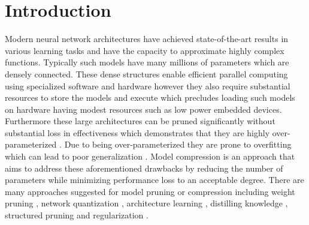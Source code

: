 \documentclass[final,1p,times]{elsarticle}
\begin{document}
\section{Introduction}
\label{s:Introduction}
Modern neural network architectures have achieved state-of-the-art results in various learning tasks and have the capacity to approximate highly complex functions. Typically such models have many millions of parameters which are densely connected. These dense structures enable efficient parallel computing using specialized software and hardware however they also require substantial resources to store the models and execute which precludes loading such models on hardware having modest resources such as low power embedded devices. Furthermore these large architectures can be pruned significantly without substantial loss in effectiveness which demonstrates that they are highly over-parameterized \cite{liu2018rethinking}. Due to being over-parameterized they are prone to overfitting which can lead to poor generalization \cite{45820}. Model compression is an approach that aims to address these aforementioned drawbacks by reducing the number of parameters while minimizing performance loss to an acceptable degree. There are many approaches suggested for model pruning or compression including weight pruning \cite{10.5555/2969239.2969366}, network quantization \cite{courbariaux2016binarized}, architecture learning \cite{DBLP:conf/bmvc/SrinivasB16}, distilling knowledge \cite{44873}, structured pruning \cite{NIPS2016_6504} and  regularization \cite{louizos2018learning}. 
\end{document}
